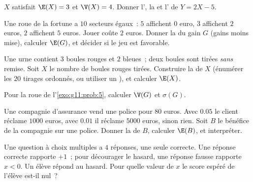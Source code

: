 \begin{exercise}[$\star$]\label{exo:g11:prob:4}
$X$ satisfait $\E(X) = 3$ et $\V(X) = 4$. Donner l', la 
et l' de $Y = 2X - 5$.
\end{exercise}

\begin{exercise}[$\star\star$]\label{exo:g11:prob:5}
Une roue de la fortune a $10$ secteurs égaux~: $5$ affichent $0$ euro,
$3$ affichent $2$ euros, $2$ affichent $5$ euros. Jouer coûte $2$ euros.
Donner la  du gain $G$ (gains moins mise), calculer $\E(G)$, et
décider si le jeu est favorable.
\end{exercise}

\begin{exercise}[$\star\star$]\label{exo:g11:prob:6}
Une urne contient $3$ boules rouges et $2$ bleues~; deux boules sont
tirées \emph{sans} remise. Soit $X$ le nombre de boules rouges tirées.
Construire la  de $X$ (énumérer les $20$ tirages ordonnés, ou
utiliser un ), et calculer $\E(X)$.
\end{exercise}

\begin{exercise}[$\star\star$]\label{exo:g11:prob:7}
Pour la roue de l'\cref{exo:g11:prob:5}, calculer $\V(G)$ et $\sigma(G)$.
\end{exercise}

\begin{exercise}[$\star\star$]\label{exo:g11:prob:8}
Une compagnie d'assurance vend une police pour $80$ euros. Avec
 $0.05$ le client réclame $1000$ euros, avec 
$0.01$ il réclame $5000$ euros, sinon rien. Soit $B$ le bénéfice de la
compagnie sur une police. Donner la  de $B$, calculer $\E(B)$, et
interpréter.
\end{exercise}

\begin{exercise}[$\star\star$]\label{exo:g11:prob:9}
Une question à choix multiples a $4$ réponses, une seule correcte. Une
réponse correcte rapporte $+1$~; pour décourager le hasard, une réponse
fausse rapporte $x < 0$. Un élève répond au hasard. Pour quelle valeur
de $x$ le score espéré de l'élève est-il nul~?
\end{exercise}

